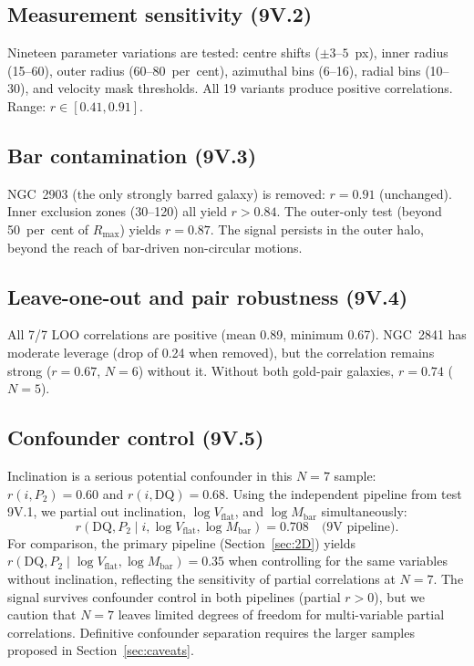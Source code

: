 \documentclass[fleqn,usenatbib]{mnras}
\newcommand{\vflat}{V_\mathrm{flat}}
\newcommand{\DQ}{\mathrm{DQ}}
\begin{document}
\subsection{Measurement sensitivity (9V.2)}

Nineteen parameter variations are tested: centre shifts ($\pm 3$--$5$~px), inner radius (15\arcsec--60\arcsec), outer radius (60--80~per~cent), azimuthal bins (6--16), radial bins (10--30), and velocity mask thresholds.
All 19 variants produce positive correlations.
Range: $r \in [0.41, 0.91]$.

\subsection{Bar contamination (9V.3)}

NGC~2903 (the only strongly barred galaxy) is removed: $r = 0.91$ (unchanged).
Inner exclusion zones (30\arcsec--120\arcsec) all yield $r > 0.84$.
The outer-only test (beyond 50~per~cent of $R_\mathrm{max}$) yields $r = 0.87$.
The signal persists in the outer halo, beyond the reach of bar-driven non-circular motions.

\subsection{Leave-one-out and pair robustness (9V.4)}

All 7/7 LOO correlations are positive (mean 0.89, minimum 0.67).
NGC~2841 has moderate leverage (drop of 0.24 when removed), but the correlation remains strong ($r = 0.67$, $N = 6$) without it.
Without both gold-pair galaxies, $r = 0.74$ ($N = 5$).

\subsection{Confounder control (9V.5)}

Inclination is a serious potential confounder in this $N = 7$ sample: $r(i, P_2) = 0.60$ and $r(i, \DQ) = 0.68$.
Using the independent pipeline from test 9V.1, we partial out inclination, $\log\vflat$, and $\log M_\mathrm{bar}$ simultaneously:
\begin{equation}
r(\DQ, P_2 \mid i, \log\vflat, \log M_\mathrm{bar}) = 0.708 \quad \text{(9V pipeline)}.
\end{equation}
For comparison, the primary pipeline (Section~\ref{sec:2D}) yields $r(\DQ, P_2 \mid \log\vflat, \log M_\mathrm{bar}) = 0.35$ when controlling for the same variables without inclination, reflecting the sensitivity of partial correlations at $N = 7$.
The signal survives confounder control in both pipelines (partial $r > 0$), but we caution that $N = 7$ leaves limited degrees of freedom for multi-variable partial correlations.
Definitive confounder separation requires the larger samples proposed in Section~\ref{sec:caveats}.
\end{document}
